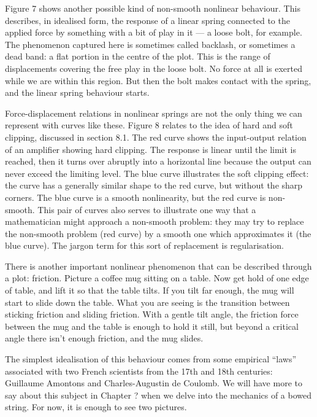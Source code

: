   Figure 7 shows another possible kind of non-smooth nonlinear behaviour. This 
  describes, in idealised form, the response of a linear spring connected to 
  the applied force by something with a bit of play in it — a loose bolt, for 
  example. The phenomenon captured here is sometimes called backlash, or 
  sometimes a dead band: a flat portion in the centre of the plot. This is the 
  range of displacements covering the free play in the loose bolt. No force at 
  all is exerted while we are within this region. But then the bolt makes 
  contact with the spring, and the linear spring behaviour starts. 

  Force-displacement relations in nonlinear springs are not the only thing we 
  can represent with curves like these. Figure 8 relates to the idea of hard 
  and soft clipping, discussed in section 8.1. The red curve shows the 
  input-output relation of an amplifier showing hard clipping. The response is 
  linear until the limit is reached, then it turns over abruptly into a 
  horizontal line because the output can never exceed the limiting level. The 
  blue curve illustrates the soft clipping effect: the curve has a generally 
  similar shape to the red curve, but without the sharp corners. The blue curve 
  is a smooth nonlinearity, but the red curve is non-smooth. This pair of 
  curves also serves to illustrate one way that a mathematician might approach 
  a non-smooth problem: they may try to replace the non-smooth problem (red 
  curve) by a smooth one which approximates it (the blue curve). The jargon 
  term for this sort of replacement is regularisation. 

  There is another important nonlinear phenomenon that can be described through 
  a plot: friction. Picture a coffee mug sitting on a table. Now get hold of 
  one edge of table, and lift it so that the table tilts. If you tilt far 
  enough, the mug will start to slide down the table. What you are seeing is 
  the transition between sticking friction and sliding friction. With a gentle 
  tilt angle, the friction force between the mug and the table is enough to 
  hold it still, but beyond a critical angle there isn’t enough friction, and 
  the mug slides. 

  The simplest idealisation of this behaviour comes from some empirical “laws” 
  associated with two French scientists from the 17th and 18th centuries: 
  Guillaume Amontons and Charles-Augustin de Coulomb. We will have more to say 
  about this subject in Chapter ? when we delve into the mechanics of a bowed 
  string. For now, it is enough to see two pictures. 

